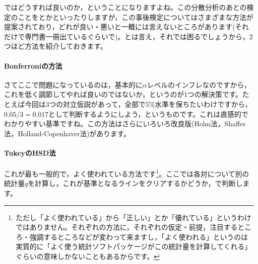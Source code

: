 \documentclass{ltjbook}
\begin{document}


			ではどうすれば良いのか，ということになりますよね。この分散分析のあとの検定のことをとかといったりしますが，この事後検定についてはさまざまな方法が提案されており，どれが良い・悪いと一概には言えないところがあります(それだけで専門書一冊出ているぐらいで\parencite{BA33892274})。とは言え，それでは困るでしょうから，2つほど方法を紹介しておきます。

			\paragraph{Bonferroniの方法}さてここで問題になっているのは，基本的に$\alpha$レベルのインフレなのですから，これを低く調節してやれば良いのではないか，というのが1つの解決策です。たとえば今回は3つの対立仮説があって，全部で5\%水準を保ちたいわけですから，$0.05/3=0.017$として判断するようにしよう，というものです。これは直感的でわかりやすい基準ですね。この方法はさらにいろいろ改良版(Holm法，Shaffer	法，Holland-Copenhaver法)があります。

			\paragraph{TukeyのHSD法}これが最も一般的で，よく使われている方法です\footnote{ただし「よく使われている」から「正しい」とか「優れている」というわけではありません。それぞれの方法に，それぞれの仮定・前提，注目するところ・強調するところなどが変わって来ますし，「よく使われる」というのは実質的に「よく使う統計ソフトパッケージがこの統計量を計算してくれる」ぐらいの意味しかないこともあるからです。}。ここでは各対について別の統計量$q$を計算し，これが基準となるラインをクリアするかどうか，で判断します。
\end{document}
